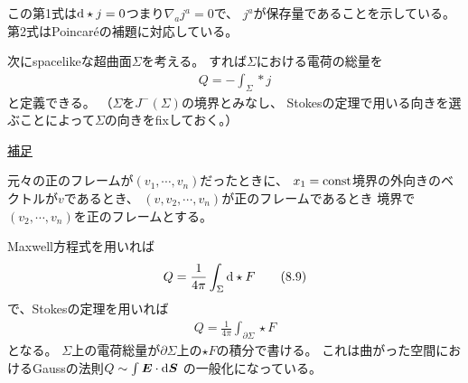 \documentclass[a4paper, 12pt]{jsarticle}
\theoremstyle{definition}
\def\vec#1{\mbox{\boldmath $#1$}}
\newcommand{\ddif}{{\rm d}}
\begin{document}
この第1式は$\ddif \star j = 0$つまり$\nabla_a j^a = 0$で、
$j^a$が保存量であることを示している。
第2式はPoincar\'{e}の補題に対応している。

次にspacelikeな超曲面$\Sigma$を考える。
すれば$\Sigma$における電荷の総量を
\begin{align}
	Q = - \int_{\Sigma} * j \tag{8.8} \label{8.8}
\end{align}
と定義できる。
（$\Sigma$を$J^-(\Sigma)$の境界とみなし、
Stokesの定理で用いる向きを選ぶことによって$\Sigma$の向きをfixしておく。）
\begin{screen}
	\underline{補足}

	元々の正のフレームが$(v_1, \cdots, v_n)$だったときに、
	$x_1 = {\rm const}$境界の外向きのベクトルが$v$であるとき、
	$(v, v_2, \cdots, v_n)$が正のフレームであるとき
	境界で$(v_2, \cdots, v_n)$を正のフレームとする。
\end{screen}

Maxwell方程式を用いれば
\begin{align}
	Q = \frac{1}{4\pi} \int_{\Sigma} \ddif \star F \tag{8.9} \label{8.9}
\end{align}
で、Stokesの定理を用いれば
\begin{align}
	Q = \frac{1}{4\pi} \int_{\partial \Sigma} \star F \tag{8.10} \label{8.10}
\end{align}
となる。
$\Sigma$上の電荷総量が$\partial \Sigma$上の$\star F$の積分で書ける。
これは曲がった空間におけるGaussの法則$Q \sim \int \vec{E} \cdot \ddif \vec{S}$
の一般化になっている。
\end{document}
